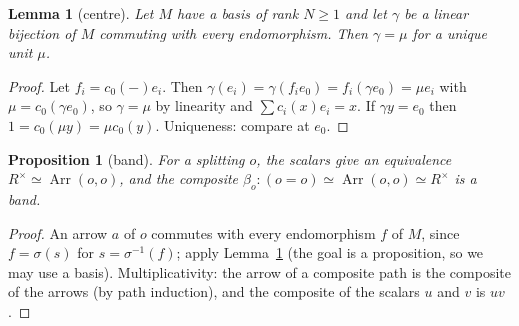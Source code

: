 \documentclass[11pt]{amsart}
\newtheorem{lemma}[theorem]{Lemma}
\newtheorem{proposition}[theorem]{Proposition}
\theoremstyle{definition}
\theoremstyle{remark}
\newcommand{\Arr}{\operatorname{Arr}}
\newcommand{\Rx}{R^\times}
\begin{document}
\begin{lemma}[centre]\label{l:centre}
Let $M$ have a basis of rank $N\geq1$ and let $\gamma$ be a linear bijection
of $M$ commuting with every endomorphism. Then $\gamma=\mu$ for a unique
unit $\mu$.
\end{lemma}
\begin{proof}
Let $f_i=c_0(-)e_i$. Then $\gamma(e_i)=\gamma(f_ie_0)=f_i(\gamma
e_0)=\mu e_i$ with $\mu=c_0(\gamma e_0)$, so $\gamma=\mu$ by linearity and
$\sum c_i(x)e_i=x$. If $\gamma y=e_0$ then $1=c_0(\mu y)=\mu c_0(y)$.
Uniqueness: compare at $e_0$.
\end{proof}

\begin{proposition}[band]\label{p:band}
For a splitting $o$, the scalars give an equivalence
$\Rx\simeq\Arr(o,o)$, and the composite
$\beta_o:(o=o)\simeq\Arr(o,o)\simeq\Rx$ is a band.
\end{proposition}
\begin{proof}
An arrow $a$ of $o$ commutes with every endomorphism $f$ of $M$, since
$f=\sigma(s)$ for $s=\sigma^{-1}(f)$; apply Lemma~\ref{l:centre} (the goal
is a proposition, so we may use a basis). Multiplicativity: the arrow of a
composite path is the composite of the arrows (by path induction), and
the composite of the scalars $u$ and $v$ is $uv$.
\end{proof}
\end{document}
